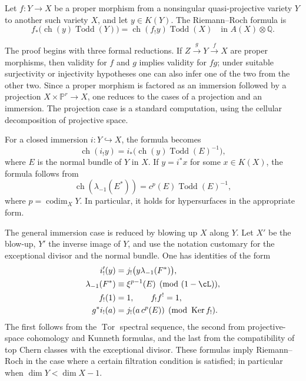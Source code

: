 \documentclass[11pt]{article}
\theoremstyle{plain}
\theoremstyle{definition}
\theoremstyle{remark}
\newcommand{\PP}{\mathbb P}
\newcommand{\QQ}{\mathbb Q}
\DeclareMathOperator{\Tor}{Tor}
\DeclareMathOperator{\Ker}{Ker}
\DeclareMathOperator{\codim}{codim}
\providecommand{\ch}{\operatorname{ch}}
\providecommand{\codim}{\operatorname{codim}}
\providecommand{\Todd}{\operatorname{Todd}}
\begin{document}
Let $f:Y\to X$ be a proper morphism from a nonsingular quasi-projective variety $Y$ to another such variety $X$, and let $y\in K(Y)$. The Riemann--Roch formula is
\begin{equation}\label{eq:RRreport}
   f_*\bigl(\ch(y)\Todd(Y)\bigr)=\ch(f_!y)\Todd(X)
   \quad\text{in }A(X)\otimes\QQ.
\end{equation}

The proof begins with three formal reductions. If $Z\xrightarrow gY\xrightarrow fX$ are proper morphisms, then validity for $f$ and $g$ implies validity for $fg$; under suitable surjectivity or injectivity hypotheses one can also infer one of the two from the other two. Since a proper morphism is factored as an immersion followed by a projection $X\times\PP^r\to X$, one reduces to the cases of a projection and an immersion. The projection case is a standard computation, using the cellular decomposition of projective space.

For a closed immersion $i:Y\hookrightarrow X$, the formula becomes
\begin{equation}\label{eq:RRimmersion}
   \ch(i_!y)=i_*\bigl(\ch(y)\Todd(E)^{-1}\bigr),
\end{equation}
where $E$ is the normal bundle of $Y$ in $X$. If $y=i^*x$ for some $x\in K(X)$, the formula follows from
\begin{equation}\label{eq:lambdanormal}
   \ch(\lambda_{-1}(E^*))=c^p(E)\Todd(E)^{-1},
\end{equation}
where $p=\codim_XY$. In particular, it holds for hypersurfaces in the appropriate form.

The general immersion case is reduced by blowing up $X$ along $Y$. Let $X'$ be the blow-up, $Y'$ the inverse image of $Y$, and use the notation customary for the exceptional divisor and the normal bundle. One has identities of the form
\begin{align*}
 i'_!(y) &= j_!\bigl(y\lambda_{-1}(F^*)\bigr),\\
 \lambda_{-1}(F^*) &\equiv \xi^{p-1}(E)\pmod{(1-\cL)},\\
 f_!(1)&=1,
 \qquad f_!f^!=1,\\
 g^*i_!(a)&=j_!(a\,c^p(E))\pmod{\Ker f_!}.
\end{align*}
The first follows from the $\Tor$ spectral sequence, the second from projective-space cohomology and Kunneth formulas, and the last from the compatibility of top Chern classes with the exceptional divisor. These formulas imply Riemann--Roch in the case where a certain filtration condition is satisfied; in particular when $\dim Y<\dim X-1$.
\end{document}
